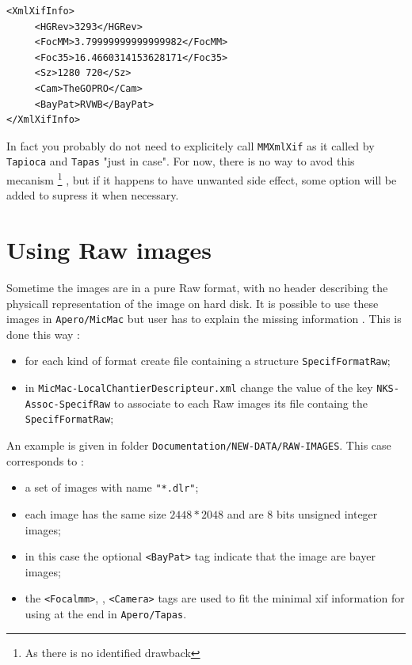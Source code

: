 \begin{verbatim}
<XmlXifInfo>
     <HGRev>3293</HGRev>
     <FocMM>3.79999999999999982</FocMM>
     <Foc35>16.4660314153628171</Foc35>
     <Sz>1280 720</Sz>
     <Cam>TheGOPRO</Cam>
     <BayPat>RVWB</BayPat>
</XmlXifInfo>
\end{verbatim}


In fact you probably do not need to explicitely call  {\tt MMXmlXif} as it called by {\tt Tapioca} and {\tt Tapas}
"just in case". For now, there is no way to avod this mecanism \footnote{As there is no identified drawback}
, but if it happens to have unwanted side effect,
some option will be added to supress it when necessary.





\section{Using Raw images}

Sometime the images are in a pure Raw format, with no header describing the physicall representation
of the image on hard disk. It is possible to use these images in {\tt Apero/MicMac} but user has
to explain the missing information . This is done this way :

\begin{itemize}
       \item for each kind of format create file containing a structure {\tt SpecifFormatRaw};

       \item in {\tt MicMac-LocalChantierDescripteur.xml} change the value of the key {\tt NKS-Assoc-SpecifRaw} to associate to each Raw images its file containg the {\tt SpecifFormatRaw};

\end{itemize}

An example is given in folder {\tt Documentation/NEW-DATA/RAW-IMAGES}. This case corresponds to :


\begin{itemize}

       \item a set of images with name {\tt "*.dlr"};

       \item each image has the same size $2448 * 2048$ and are $8$ bits unsigned integer images;

       \item in this case the optional {\tt <BayPat>} tag indicate that the image are bayer images;

       \item the {\tt <Focalmm>}, {\tt <FocalEqui35>} , {\tt <Camera>} tags are used to fit the minimal 
             xif information for using at the end in {\tt Apero/Tapas}. 

\end{itemize}

